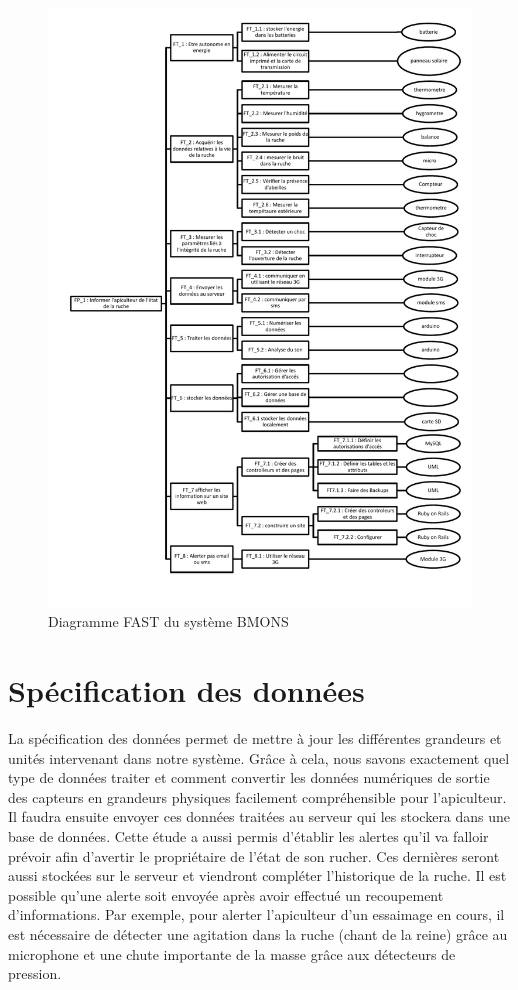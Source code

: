 \begin{figure}[h!]
\centering\includegraphics[scale=0.8]{FAST_BMONS.pdf}
\caption{\label{fig:fast} Diagramme FAST du système BMONS}
\end{figure}

\clearpage

\section{Spécification des données}
\vspace{1.5cm}
La spécification des données permet de mettre à jour les différentes grandeurs et unités intervenant dans notre système. Grâce à cela, nous savons exactement quel type de données traiter et comment convertir les données numériques de sortie des capteurs en grandeurs physiques facilement compréhensible pour l'apiculteur. Il faudra ensuite envoyer ces données traitées au serveur qui les stockera dans une base de données. Cette étude a aussi permis d'établir les alertes qu'il va falloir prévoir afin d'avertir le propriétaire de l'état de son rucher. Ces dernières seront aussi stockées sur le serveur et viendront compléter l'historique de la ruche. Il est possible qu'une alerte soit envoyée après avoir effectué un recoupement d'informations. Par exemple, pour alerter l'apiculteur d'un essaimage en cours, il est nécessaire de détecter une agitation dans la ruche (chant de la reine) grâce au microphone et une chute importante de la masse grâce aux détecteurs de pression. 

